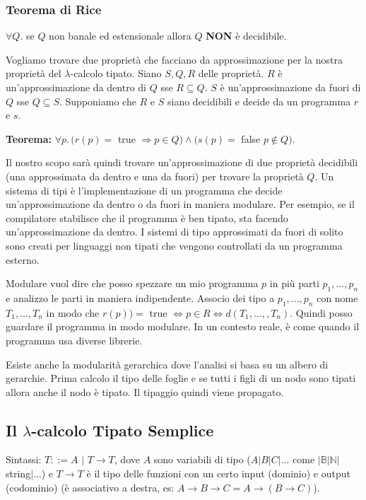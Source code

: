 \documentclass{article}
\begin{document}
\subsubsection{Teorema di Rice}
$\forall Q.$ se $Q$ non banale ed estensionale allora $Q$ \textbf{NON} è decidibile.

\bigskip

Vogliamo trovare due proprietà che facciano da approssimazione per la nostra proprietà del $\lambda$-calcolo tipato. Siano $S, Q, R$ delle proprietà. $R$ è un'approssimazione da dentro di $Q$ sse $R \subseteq Q$. $S$ è un'approssimazione da fuori di $Q$ sse $Q \subseteq S$. Supponiamo che $R$ e $S$ siano decidibili e decide da un programma $r$ e $s$.

\bigskip

\textbf{Teorema:} $\forall p.\, (r(p)=$ true $\Rightarrow p\in Q) \land (s(p) =$ false $p\not\in Q)$.

\bigskip

Il nostro scopo sarà quindi trovare un'approssimazione di due proprietà decidibili (una approssimata da dentro e una da fuori) per trovare la proprietà $Q$. Un sistema di tipi è l'implementazione di un programma che decide un'approssimazione da dentro o da fuori {\color{red}in maniera modulare}. Per esempio, se il compilatore stabilisce che il programma è ben tipato, sta facendo un'approssimazione da dentro. I sistemi di tipo approssimati da fuori di solito sono creati per linguaggi non tipati che vengono controllati da un programma esterno.

\bigskip

Modulare vuol dire che posso spezzare un mio programma $p$ in più parti $p_1,...,p_n$ e analizzo le parti in maniera indipendente. Associo dei tipo a $p_1,...,p_n$ con nome $T_1,..., T_n$ in modo che $r(p))=$ true $\iff p\in R\iff d(T_1,...,,T_n)$. Quindi posso guardare il programma in modo modulare. In un contesto reale, è come quando il programma usa diverse librerie.

\bigskip

Esiste anche la {\color{red}modularità gerarchica} dove l'analisi si basa su un albero di gerarchie. Prima calcolo il tipo delle foglie e se tutti i figli di un nodo sono tipati allora anche il nodo è tipato. Il tipaggio quindi viene propagato.

\subsection{Il $\lambda$-calcolo Tipato Semplice}
Sintassi: $T::= A\,\, |\,\, T\to T$, dove $A$ sono variabili di tipo ($A|B|C|...$ come $|\mathbb{B}|\mathbb{N}|$string$|...$) e $T\to T$ è il tipo delle funzioni con un certo input (dominio) e output (codominio) (è associativo a destra, es: $A\to B\to C = A\to(B\to C)$).
\end{document}
